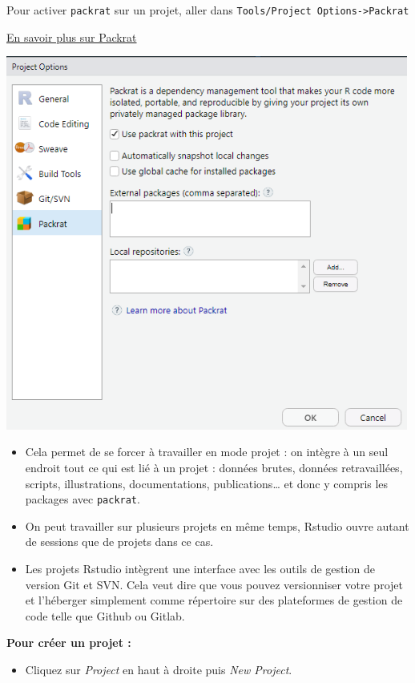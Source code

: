 \documentclass[]{book}
\providecommand{\tightlist}{%
  \setlength{\itemsep}{0pt}\setlength{\parskip}{0pt}}
\begin{document}
Pour activer \texttt{packrat} sur un projet, aller dans \texttt{Tools/Project\ Options-\textgreater{}Packrat}

\href{https://www.rstudio.com/resources/webinars/managing-package-dependencies-in-r-with-packrat/}{En savoir plus sur Packrat}

\includegraphics[width=5.20833in,height=\textheight]{images/creerprojet4.png}

\begin{itemize}
\item
  Cela permet de se forcer à travailler en mode projet : on intègre à un seul endroit tout ce qui est lié à un projet : données brutes, données retravaillées, scripts, illustrations, documentations, publications\ldots{} et donc y compris les packages avec \texttt{packrat}.
\item
  On peut travailler sur plusieurs projets en même temps, Rstudio ouvre autant de sessions que de projets dans ce cas.
\item
  Les projets Rstudio intègrent une interface avec les outils de gestion de version Git et SVN. Cela veut dire que vous pouvez versionniser votre projet et l'héberger simplement comme répertoire sur des plateformes de gestion de code telle que Github ou Gitlab.
\end{itemize}

\textbf{Pour créer un projet : }

\begin{itemize}
\tightlist
\item
  Cliquez sur \emph{Project} en haut à droite puis \emph{New Project}.
\end{itemize}
\end{document}
